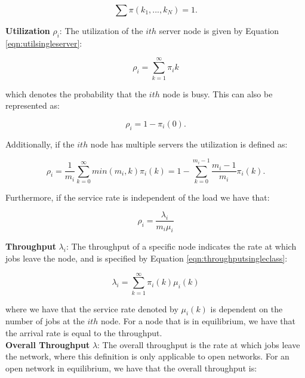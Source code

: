 \documentclass[a4paper,11pt,titlepage]{article}
\begin{document}
\begin{equation}
    \sum \pi(k_1,...,k_N) = 1.
\end{equation}

\textbf{Utilization} $\rho_i$: The utilization of the $ith$ server node is given by Equation \ref{eqn:utilsingleserver}:

\begin{equation}
    \rho_i = \sum_{k=1}^{\infty} \pi_i k
    \label{eqn:utilsingleserver}
\end{equation}

which denotes the probability that the $ith$ node is busy. This can also be represented as: 

\begin{equation}
    \rho_i = 1 - \pi_i(0).
\end{equation}

Additionally, if the $ith$ node has multiple servers the utilization is defined as: 

\begin{equation}
    \rho_i = \frac{1}{m_i} \sum_{k = 0}^{\infty} min(m_i, k) \pi_i(k) = 1 - \sum_{k = 0}^{m_i - 1} \frac{m_i - 1}{m_i} \pi_i(k). 
\end{equation}

Furthermore, if the service rate is independent of the load we have that: 

\begin{equation}
    \rho_i = \frac{\lambda_i}{m_i \mu_i}
\end{equation}

\textbf{Throughput} $\lambda_i$: The throughput of a specific node indicates the rate at which jobs leave the node, and is specified by Equation \ref{eqn:throughputsingleclass}:

\begin{equation}
    \lambda_i = \sum_{k = 1}^{\infty} \pi_i(k) \mu_i(k)
    \label{eqn:throughputsingleclass}
\end{equation}

where we have that the service rate denoted by $\mu_i(k)$ is dependent on the number of jobs at the $ith$ node. For a node that is in equilibrium, we have that the arrival rate is equal to the throughput. \\

\textbf{Overall Throughput} $\lambda$: The overall throughput is the rate at which jobs leave the network, where this definition is only applicable to open networks. For an open network in equilibrium, we have that the overall throughput is: 
\end{document}
